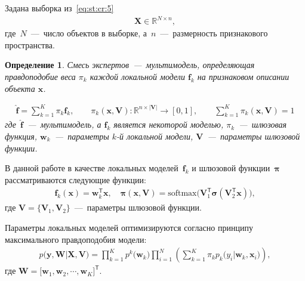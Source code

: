 \documentclass[12pt, twoside]{article}
\newtheorem{definition}{Определение}[section]
\numberwithin{equation}{section}
\begin{document}
Задана выборка из~\eqref{eq:st:cr:5} 
\begin{equation}
\label{eq:st:1}
\begin{aligned}
\textbf{X} \in \mathbb{R}^{N \times n},
\end{aligned}
\end{equation}
где~$N$~---~число объектов в выборке, а~$n$~---~размерность признакового пространства.

\begin{definition}
\label{def:1}
Смесь экспертов~---~мультимодель, определяющая правдоподобие веса $\pi_k$ каждой локальной модели $\textbf{f}_k$ на признаковом описании объекта $\textbf{x}$.

\begin{equation}
\label{eq:st:2}
\begin{aligned}
\hat{\mathbf{f}} = \sum_{k=1}^{K}\pi_{k}\mathbf{f}_k, \qquad \pi_{k}\left(\mathbf{x}, \mathbf{V}\right):\mathbb{R}^{n\times \left|\mathbf{V}\right|} \to [0, 1], \qquad \sum_{k=1}^{K}\pi_{k}\left(\mathbf{x}, \mathbf{V}\right) = 1
\end{aligned}
\end{equation}
где~$\hat{\mathbf{f}}$~---~мультимодель, а $\mathbf{f}_k$ является некоторой моделью, $\pi_k$~---~шлюзовая функция, $\mathbf{w}_k$~---~параметры $k$-й локальной модели, $\mathbf{V}$~---~параметры шлюзовой функции.
\end{definition}

В данной работе в качестве локальных моделей~$\mathbf{f}_k$ и шлюзовой функции~$\bm{\pi}$ рассматриваются следующие функции:
\begin{equation}
\label{eq:st:3}
\begin{aligned}
\mathbf{f}_k\left(\textbf{x}\right) = \textbf{w}_k^{\mathsf{T}}\textbf{x}, \quad
\bm{\pi}\left(\mathbf{x}, \mathbf{V}\right) = \text{softmax}\bigr(\mathbf{V}_{1}^{\mathsf{T}}\bm{\sigma}\left(\mathbf{V}_2^{\mathsf{T}}\mathbf{x}\right)\bigr),
\end{aligned}
\end{equation}
где $\mathbf{V} = \bigr\{\mathbf{V}_1, \mathbf{V}_2\bigr\}$~---~параметры шлюзовой функции.

Параметры локальных моделей оптимизируются согласно принципу максимального правдоподобия модели:
\begin{equation}
\label{eq:st:4}
\begin{aligned}
p\bigr(\mathbf{y}, \mathbf{W}|\mathbf{X}, \mathbf{V}\bigr) = \prod_{k=1}^{K}p^{k}\bigr(\mathbf{w}_k\bigr)\prod_{i=1}^{N}\left(\sum_{k=1}^{K}\pi_{k}p_{k}\bigr(y_i|\mathbf{w}_k, \mathbf{x}_i\bigr)\right),
\end{aligned}
\end{equation}
где $\mathbf{W} = \bigr[\mathbf{w}_1, \mathbf{w}_2, \cdots, \mathbf{w}_K\bigr]^{\mathsf{T}}.$
\end{document}
